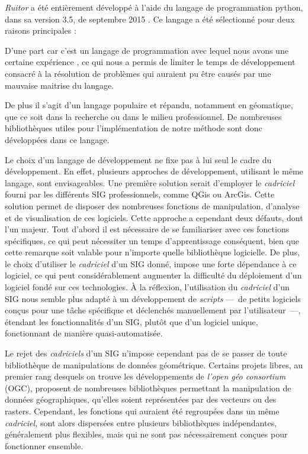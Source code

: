 \emph{Ruitor} a été entièrement développé à l'aide du langage de
programmation python, dans sa version 3.5, de septembre 2015
\autocite{VanRossum2009}. Ce langage a été sélectionné pour deux
raisons principales :
%
\begin{enumerate*}[label=(\arabic*)]
\item D'une part car c'est un langage de programmation avec lequel
  nous avons une certaine expérience \autocite{Bunel2017b,Bunel2017c},
  ce qui nous a permis de limiter le temps de développement consacré à
  la résolution de problèmes qui auraient pu être causés par une
  mauvaise maitrise du langage.
\item De plus il s'agit d'un langage populaire et répandu, notamment
  en géomatique, que ce soit dans la recherche ou dans le milieu
  professionnel. De nombreuses bibliothèques utiles pour
  l'implémentation de notre méthode sont donc développées dans ce
  langage.
\end{enumerate*}
%
Le choix d'un langage de développement ne fixe pas à lui seul le cadre
du développement. En effet, plusieurs approches de développement,
utilisant le même langage, sont envisageables. Une première solution
serait d'employer le \emph{cadriciel} fourni par les différents SIG
professionnels, comme QGis ou ArcGis. Cette solution permet de
disposer des nombreuses fonctions de manipulation, d'analyse et de
visualisation de ces logiciels. Cette approche a cependant deux
défauts, dont l'un majeur. Tout d'abord il est nécessaire de se
familiariser avec ces fonctions spécifiques, ce qui peut nécessiter un
temps d’apprentissage conséquent, bien que cette remarque soit valable
pour n'importe quelle bibliothèque logicielle. De plus, le choix
d'utiliser le \emph{cadriciel} d'un SIG donné, impose une forte
dépendance à ce logiciel, ce qui peut considérablement augmenter la
difficulté du déploiement d'un logiciel fondé sur ces technologies. À
la réflexion, l'utilisation du \emph{cadriciel} d'un SIG nous semble
plus adapté à un développement de \emph{scripts} ---~de petits
logiciels conçus pour une tâche spécifique et déclenchés manuellement
par l'utilisateur~---, étendant les fonctionnalités d'un SIG, plutôt
que d'un logiciel unique, fonctionnant de manière quasi-automatisée.

Le rejet des \emph{cadriciels} d'un SIG n'impose cependant pas de se
passer de toute bibliothèque de manipulations de données
géométrique. Certains projets libres, au premier rang desquels on
trouve les développements de \emph{l'open géo consortium} (OGC),
proposent de nombreuses bibliothèques permettant la manipulation de
données géographiques, qu'elles soient représentées par des vecteurs
ou des rasters. Cependant, les fonctions qui auraient été regroupées
dans un même \emph{cadriciel,} sont alors dispersées entre plusieurs
bibliothèques indépendantes, généralement plus flexibles, mais qui ne
sont pas nécessairement conçues pour fonctionner ensemble.

